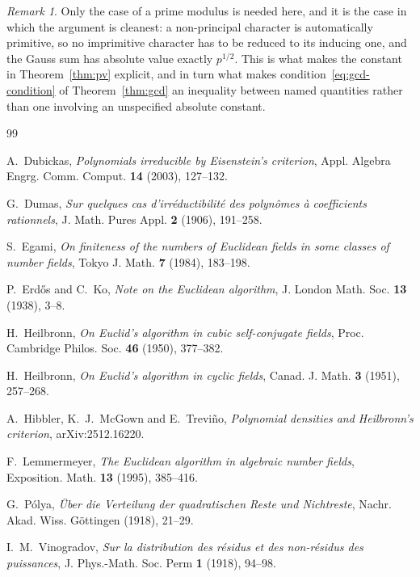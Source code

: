 \documentclass[11pt,reqno]{amsart}
\theoremstyle{plain}
\theoremstyle{definition}
\theoremstyle{remark}
\newtheorem{remark}[theorem]{Remark}
\begin{document}
\begin{remark}
Only the case of a prime modulus is needed here, and it is the case in which the argument is
cleanest: a non-principal character is automatically primitive, so no imprimitive character has
to be reduced to its inducing one, and the Gauss sum has absolute value exactly $p^{1/2}$. This is
what makes the constant in Theorem~\ref{thm:pv} explicit, and in turn what makes
condition~\eqref{eq:gcd-condition} of Theorem~\ref{thm:gcd} an inequality between named
quantities rather than one involving an unspecified absolute constant.
\end{remark}

\begin{thebibliography}{99}

 A.~Dubickas, \emph{Polynomials irreducible by Eisenstein's criterion},
Appl. Algebra Engrg. Comm. Comput. \textbf{14} (2003), 127--132.

 G.~Dumas, \emph{Sur quelques cas d'irr\'eductibilit\'e des polyn\^omes \`a
coefficients rationnels}, J. Math. Pures Appl. \textbf{2} (1906), 191--258.

 S.~Egami, \emph{On finiteness of the numbers of Euclidean fields in some classes
of number fields}, Tokyo J. Math. \textbf{7} (1984), 183--198.

 P.~Erd\H{o}s and C.~Ko, \emph{Note on the Euclidean algorithm},
J. London Math. Soc. \textbf{13} (1938), 3--8.

 H.~Heilbronn, \emph{On Euclid's algorithm in cubic self-conjugate fields},
Proc. Cambridge Philos. Soc. \textbf{46} (1950), 377--382.

 H.~Heilbronn, \emph{On Euclid's algorithm in cyclic fields},
Canad. J. Math. \textbf{3} (1951), 257--268.

 A.~Hibbler, K.~J.~McGown and E.~Trevi\~no, \emph{Polynomial densities and
Heilbronn's criterion}, arXiv:2512.16220.

 F.~Lemmermeyer, \emph{The Euclidean algorithm in algebraic number fields},
Exposition. Math. \textbf{13} (1995), 385--416.

 G.~P\'olya, \emph{\"Uber die Verteilung der quadratischen Reste und Nichtreste},
Nachr. Akad. Wiss. G\"ottingen (1918), 21--29.

 I.~M.~Vinogradov, \emph{Sur la distribution des r\'esidus et des non-r\'esidus
des puissances}, J. Phys.-Math. Soc. Perm \textbf{1} (1918), 94--98.

\end{thebibliography}
\end{document}

